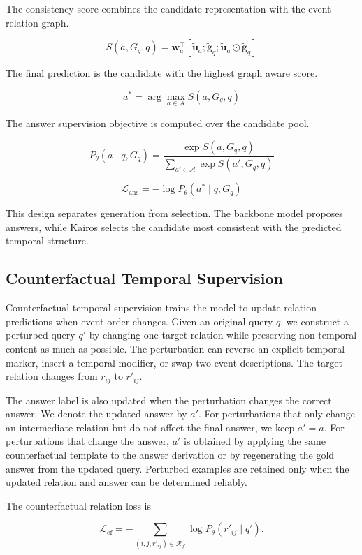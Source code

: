 \documentclass[11pt]{article}
\newcommand{\method}{Kairos}
\begin{document}
The consistency score combines the candidate representation with the event relation graph.

$$
S(a,G_q,q)
=
\mathbf{w}_a^\top
[\tilde{\mathbf{u}}_a;\tilde{\mathbf{g}}_q;
\tilde{\mathbf{u}}_a \odot \tilde{\mathbf{g}}_q]
$$

The final prediction is the candidate with the highest graph aware score.

$$
a^* = \arg\max_{a \in \mathcal{A}} S(a,G_q,q)
$$

The answer supervision objective is computed over the candidate pool.

$$
P_{\theta}(a \mid q,G_q)
=
\frac{\exp S(a,G_q,q)}
{\sum_{a' \in \mathcal{A}}\exp S(a',G_q,q)}
$$

$$
\mathcal{L}_{\mathrm{ans}}
=
-\log P_{\theta}(a^* \mid q,G_q)
$$

This design separates generation from selection. The backbone model proposes answers, while \method{} selects the candidate most consistent with the predicted temporal structure.

\subsection{Counterfactual Temporal Supervision}

Counterfactual temporal supervision trains the model to update relation predictions when event order changes. Given an original query \(q\), we construct a perturbed query \(q'\) by changing one target relation while preserving non temporal content as much as possible. The perturbation can reverse an explicit temporal marker, insert a temporal modifier, or swap two event descriptions. The target relation changes from \(r_{ij}\) to \(r'_{ij}\).

The answer label is also updated when the perturbation changes the correct answer. We denote the updated answer by \(a'\). For perturbations that only change an intermediate relation but do not affect the final answer, we keep \(a'=a\). For perturbations that change the answer, \(a'\) is obtained by applying the same counterfactual template to the answer derivation or by regenerating the gold answer from the updated query. Perturbed examples are retained only when the updated relation and answer can be determined reliably.

The counterfactual relation loss is

$$
\mathcal{L}_{\mathrm{cf}}
=
-\sum_{(i,j,r'_{ij}) \in \mathcal{R}_{q'}}
\log P_{\theta}(r'_{ij} \mid q').
$$
\end{document}
